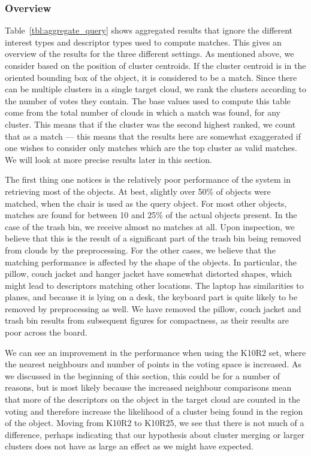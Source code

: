 \documentclass[11pt,a4paper]{kth-mag}
\begin{document}
\subsubsection{Overview}
Table~\ref{tbl:aggregate_query} shows aggregated results that ignore the
different interest types and descriptor types used to compute matches. This
gives an overview of the results for the three different settings. As mentioned
above, we consider based on the position of cluster centroids. If the cluster
centroid is in the oriented bounding box of the object, it is considered to be a
match. Since there can be multiple clusters in a single target cloud, we rank
the clusters according to the number of votes they contain. The base values used
to compute this table come from the total number of clouds in which a match was
found, for any cluster. This means that if the cluster was the second highest
ranked, we count that as a match --- this means that the results here are
somewhat exaggerated if one wishes to consider only matches which are the top
cluster as valid matches. We will look at more precise results later in this
section.

The first thing one notices is the relatively poor performance of the system in
retrieving most of the objects. At best, slightly over 50\% of objects were
matched, when the chair is used as the query object. For most other objects,
matches are found for between 10 and 25\% of the actual objects present. In the
case of the trash bin, we receive almost no matches at all. Upon inspection, we
believe that this is the result of a significant part of the trash bin being
removed from clouds by the preprocessing. For the other cases, we believe that
the matching performance is affected by the shape of the objects. In particular,
the pillow, couch jacket and hanger jacket have somewhat distorted shapes, which
might lead to descriptors matching other locations. The laptop has similarities
to planes, and because it is lying on a desk, the keyboard part is quite likely
to be removed by preprocessing as well. We have removed the pillow, couch jacket
and trash bin results from subsequent figures for compactness, as their results
are poor across the board.

We can see an improvement in the performance when using the K10R2 set, where the
nearest neighbours and number of points in the voting space is increased. As we
discussed in the beginning of this section, this could be for a number of
reasons, but is most likely because the increased neighbour comparisons mean
that more of the descriptors on the object in the target cloud are counted in
the voting and therefore increase the likelihood of a cluster being found in the
region of the object. Moving from K10R2 to K10R25, we see that there is not much
of a difference, perhaps indicating that our hypothesis about cluster merging or
larger clusters does not have as large an effect as we might have expected.
\end{document}

